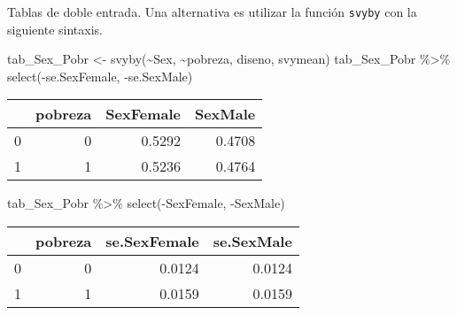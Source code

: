\documentclass[
  ignorenonframetext,
]{beamer}
\newenvironment{Shaded}{\begin{snugshade}}{\end{snugshade}}
\newcommand{\FunctionTok}[1]{\textcolor[rgb]{0.00,0.00,0.00}{#1}}
\newcommand{\NormalTok}[1]{#1}
\newcommand{\OtherTok}[1]{\textcolor[rgb]{0.56,0.35,0.01}{#1}}
\newcommand{\SpecialCharTok}[1]{\textcolor[rgb]{0.00,0.00,0.00}{#1}}
\begin{document}
\begin{frame}[fragile]{Tablas de doble entrada.}
\protect\hypertarget{tablas-de-doble-entrada.}{}
Una alternativa es utilizar la función \texttt{svyby} con la siguiente
sintaxis. \scriptsize

\begin{Shaded}
\begin{Highlighting}[]
\NormalTok{tab\_Sex\_Pobr }\OtherTok{\textless{}{-}} \FunctionTok{svyby}\NormalTok{(}\SpecialCharTok{\textasciitilde{}}\NormalTok{Sex,  }\SpecialCharTok{\textasciitilde{}}\NormalTok{pobreza, diseno, svymean)}
\NormalTok{tab\_Sex\_Pobr }\SpecialCharTok{\%\textgreater{}\%} \FunctionTok{select}\NormalTok{(}\SpecialCharTok{{-}}\NormalTok{se.SexFemale, }\SpecialCharTok{{-}}\NormalTok{se.SexMale)}
\end{Highlighting}
\end{Shaded}

\begin{longtable}[]{@{}lrrr@{}}
\toprule
& pobreza & SexFemale & SexMale \\
\midrule
\endhead
0 & 0 & 0.5292 & 0.4708 \\
1 & 1 & 0.5236 & 0.4764 \\
\bottomrule
\end{longtable}

\begin{Shaded}
\begin{Highlighting}[]
\NormalTok{tab\_Sex\_Pobr }\SpecialCharTok{\%\textgreater{}\%} \FunctionTok{select}\NormalTok{(}\SpecialCharTok{{-}}\NormalTok{SexFemale, }\SpecialCharTok{{-}}\NormalTok{SexMale)}
\end{Highlighting}
\end{Shaded}

\begin{longtable}[]{@{}lrrr@{}}
\toprule
& pobreza & se.SexFemale & se.SexMale \\
\midrule
\endhead
0 & 0 & 0.0124 & 0.0124 \\
1 & 1 & 0.0159 & 0.0159 \\
\bottomrule
\end{longtable}
\end{frame}
\end{document}
